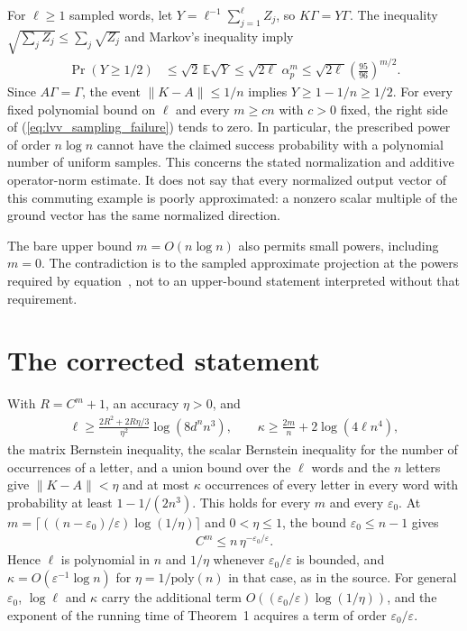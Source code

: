 \documentclass{article}
\begin{document}
For $\ell\ge1$ sampled words, let
$Y=\ell^{-1}\sum_{j=1}^{\ell}Z_j$, so $K\Gamma=Y\Gamma$.
The inequality $\sqrt{\sum_jZ_j}\le\sum_j\sqrt{Z_j}$ and Markov's
inequality imply
\begin{align}
    \Pr(Y\ge1/2)
     & \le \sqrt2\,\mathbb E\sqrt Y
    \le\sqrt{2\ell}\,\alpha_p^m
    \le\sqrt{2\ell}\left(\frac{95}{96}\right)^{m/2}.
    \label{eq:lvv_sampling_failure}
\end{align}
Since $A\Gamma=\Gamma$, the event $\|K-A\|\le1/n$ implies
$Y\ge1-1/n\ge1/2$. For every fixed polynomial bound on $\ell$ and every
$m\ge cn$ with $c>0$ fixed, the right side of
(\ref{eq:lvv_sampling_failure}) tends to zero. In particular, the
prescribed power of order $n\log n$ cannot have the claimed success
probability with a polynomial number of uniform samples.
This concerns the stated normalization and additive operator-norm estimate.
It does not say that every normalized output vector of this commuting
example is poorly approximated: a nonzero scalar multiple of the ground
vector has the same normalized direction.

The bare upper bound $m=O(n\log n)$ also permits small powers, including
$m=0$. The contradiction is to the sampled approximate projection at
the powers required by equation~, not to an
upper-bound statement interpreted without that requirement.

\section{The corrected statement}

With $R=C^m+1$, an accuracy $\eta>0$, and
\begin{align*}
    \ell\ge\frac{2R^2+2R\eta/3}{\eta^2}\log(8d^nn^3),\qquad
    \kappa\ge\frac{2m}n+2\log(4\ell n^4),
\end{align*}
the matrix Bernstein inequality, the scalar Bernstein inequality for the
number of occurrences of a letter, and a union bound over the $\ell$ words and
the $n$ letters give $\|K-A\|<\eta$ and at most $\kappa$ occurrences of every
letter in every word with probability at least $1-1/(2n^3)$. This holds for
every $m$ and every $\varepsilon_0$. At
$m=\lceil((n-\varepsilon_0)/\varepsilon)\log(1/\eta)\rceil$ and
$0<\eta\le1$, the bound $\varepsilon_0\le n-1$ gives
\begin{align*}
    C^m\le n\,\eta^{-\varepsilon_0/\varepsilon}.
\end{align*}
Hence $\ell$ is polynomial in $n$ and $1/\eta$ whenever $\varepsilon_0/\varepsilon$
is bounded, and $\kappa=O(\varepsilon^{-1}\log n)$ for $\eta=1/\mathrm{poly}(n)$
in that case, as in the source. For general $\varepsilon_0$, $\log\ell$ and
$\kappa$ carry the additional term
$O((\varepsilon_0/\varepsilon)\log(1/\eta))$, and the exponent of the running
time of Theorem~1 acquires a term of order
$\varepsilon_0/\varepsilon$.
\end{document}
